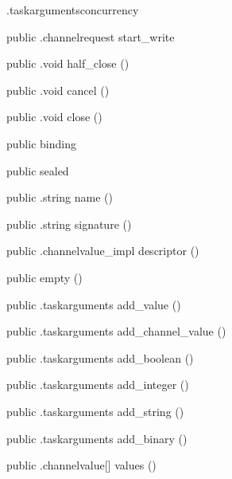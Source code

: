 \begin{CrexxClass}{.taskarguments}{concurrency}
\begin{Members}
    \Method
      {public}
      {.channelrequest}
      {start\_write}
      {}

    \Method
      {public}
      {.void}
      {half\_close}
      {()}

    \Method
      {public}
      {.void}
      {cancel}
      {()}

    \Method
      {public}
      {.void}
      {close}
      {()}

    \Factory
      {public}
      {binding}
      {}

    \Factory
      {public}
      {sealed}
      {}

    \Method
      {public}
      {.string}
      {name}
      {()}

    \Method
      {public}
      {.string}
      {signature}
      {()}

    \Method
      {public}
      {.channelvalue\_impl}
      {descriptor}
      {()}

    \Factory
      {public}
      {empty}
      {()}

    \Method
      {public}
      {.taskarguments}
      {add\_value}
      {()}

    \Method
      {public}
      {.taskarguments}
      {add\_channel\_value}
      {()}

    \Method
      {public}
      {.taskarguments}
      {add\_boolean}
      {()}

    \Method
      {public}
      {.taskarguments}
      {add\_integer}
      {()}

    \Method
      {public}
      {.taskarguments}
      {add\_string}
      {()}

    \Method
      {public}
      {.taskarguments}
      {add\_binary}
      {()}

    \Method
      {public}
      {.channelvalue[]}
      {values}
      {()}

  \end{Members}
\end{CrexxClass}

